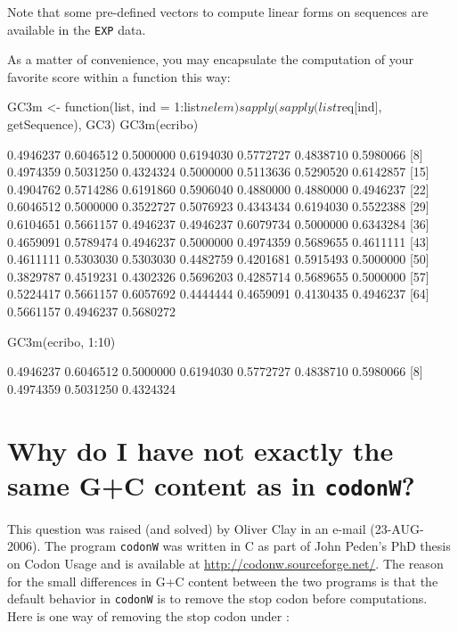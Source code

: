 \documentclass{article}
\begin{document}
Note that some pre-defined vectors to compute linear forms on sequences are
available in the \texttt{EXP} data.

As a matter of convenience, you may encapsulate the computation of your favorite score 
within a function this way:

\begin{Schunk}
\begin{Sinput}
 GC3m <- function(list, ind = 1:list$nelem) sapply(sapply(list$req[ind], getSequence), GC3)
 GC3m(ecribo)
\end{Sinput}
\begin{Soutput}
 [1] 0.4946237 0.6046512 0.5000000 0.6194030 0.5772727 0.4838710 0.5980066
 [8] 0.4974359 0.5031250 0.4324324 0.5000000 0.5113636 0.5290520 0.6142857
[15] 0.4904762 0.5714286 0.6191860 0.5906040 0.4880000 0.4880000 0.4946237
[22] 0.6046512 0.5000000 0.3522727 0.5076923 0.4343434 0.6194030 0.5522388
[29] 0.6104651 0.5661157 0.4946237 0.4946237 0.6079734 0.5000000 0.6343284
[36] 0.4659091 0.5789474 0.4946237 0.5000000 0.4974359 0.5689655 0.4611111
[43] 0.4611111 0.5303030 0.5303030 0.4482759 0.4201681 0.5915493 0.5000000
[50] 0.3829787 0.4519231 0.4302326 0.5696203 0.4285714 0.5689655 0.5000000
[57] 0.5224417 0.5661157 0.6057692 0.4444444 0.4659091 0.4130435 0.4946237
[64] 0.5661157 0.4946237 0.5680272
\end{Soutput}
\begin{Sinput}
 GC3m(ecribo, 1:10)
\end{Sinput}
\begin{Soutput}
 [1] 0.4946237 0.6046512 0.5000000 0.6194030 0.5772727 0.4838710 0.5980066
 [8] 0.4974359 0.5031250 0.4324324
\end{Soutput}
\end{Schunk}

\section{Why do I have not exactly the same G+C content as in \texttt{codonW}?}

This question was raised (and solved) by Oliver Clay in an e-mail (23-AUG-2006).
The program \texttt{codonW} was written in C as part of John Peden's PhD thesis 
on Codon Usage \cite{codonW} and is available at \url{http://codonw.sourceforge.net/}.
The reason for the small differences in G+C content between the two programs is
that the default behavior in \texttt{codonW} is to remove the stop codon before
computations. Here is one way of removing the stop codon under \Rlogo{}:
\end{document}
